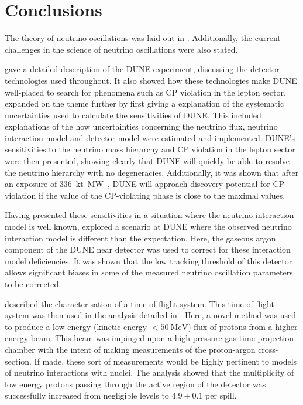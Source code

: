 \chapter{Conclusions}
\label{sec:conclusions}


The theory of neutrino oscillations was laid out in . 
Additionally, the current challenges in the science of neutrino oscillations were also stated.

 gave a detailed description of the DUNE experiment, discussing the detector technologies used throughout.
It also showed how these technologies make DUNE well-placed to search for phenomena such as CP violation in the lepton sector.
 expanded on the theme further by first giving a explanation of the systematic uncertainties used to calculate the sensitivities of DUNE. 
This included explanations of the how uncertainties concerning the neutrino flux, neutrino interaction model and detector model were estimated and implemented.
DUNE's sensitivities to the neutrino mass hierarchy and CP violation in the lepton sector were then presented, showing clearly that DUNE will quickly be able to resolve the neutrino hierarchy with no degeneracies.
Additionally, it was shown that after an exposure of \SI{336}{\kilo\tonne\mega\watt\year}, DUNE will approach discovery potential for CP violation if the value of the CP-violating phase is close to the maximal values.

Having presented these sensitivities in a situation where the neutrino interaction model is well known,  explored a scenario at DUNE where the observed neutrino interaction model is different than the expectation.
Here, the gaseous argon component of the DUNE near detector was used to correct for these interaction model deficiencies. 
It was shown that the low tracking threshold of this detector allows significant biases in some of the measured neutrino oscillation parameters to be corrected. 

 described the characterisation of a time of flight system.
This time of flight system was then used in the analysis detailed in .
Here, a novel method was used to produce a low energy (kinetic energy $<\SI{50}{\MeV}$) flux of protons from a higher energy beam.
This beam was impinged upon a high pressure gas time projection chamber with the intent of making measurements of the proton-argon cross-section.
If made, these sort of measurements would be highly pertinent to models of neutrino interactions with nuclei.
The analysis showed that the multiplicity of low energy protons passing through the active region of the detector was successfully increased from negligible levels to $4.9 \pm 0.1$ per spill.

